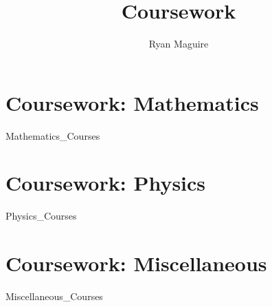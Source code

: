 \documentclass[crop=false,class=book,oneside]{standalone}
\begin{document}
    \newif\ifcourses
    \ifstandalone
        \title{Coursework}
        \author{Ryan Maguire}
        \date{\vspace{-5ex}}
        \maketitle
        \tableofcontents
        \listoffigures
        \listoftables
        \clearpage
    \fi
    \part{Coursework: Mathematics}
        {Mathematics_Courses}
    \part{Coursework: Physics}
        {Physics_Courses}
    \part{Coursework: Miscellaneous}
        {Miscellaneous_Courses}
\end{document}
